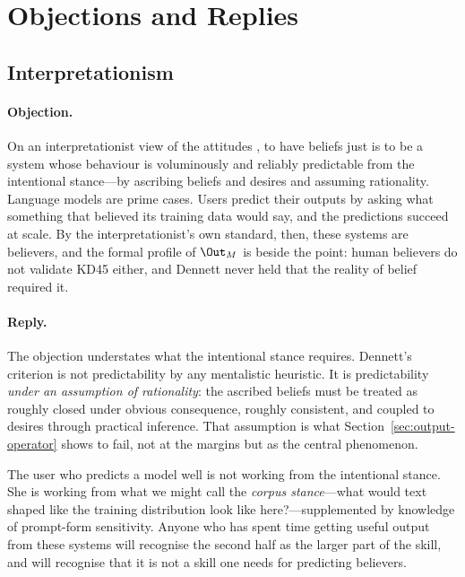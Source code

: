 \section{Objections and Replies}
\label{sec:objections}

\subsection{Interpretationism}
\label{sec:interpretationism}

\paragraph{Objection.} On an interpretationist view of the attitudes
\citep{dennett1987}, to have beliefs just is to be a system whose behaviour is
voluminously and reliably predictable from the intentional stance---by ascribing
beliefs and desires and assuming rationality. Language models are prime cases.
Users predict their outputs by asking what something that believed its training
data would say, and the predictions succeed at scale. By the interpretationist's
own standard, then, these systems are believers, and the formal profile of
$\Out_M$ is beside the point: human believers do not validate KD45 either, and
Dennett never held that the reality of belief required it.

\paragraph{Reply.} The objection understates what the intentional stance
requires. Dennett's criterion is not predictability by any mentalistic heuristic.
It is predictability \emph{under an assumption of rationality}: the ascribed
beliefs must be treated as roughly closed under obvious consequence, roughly
consistent, and coupled to desires through practical inference. That assumption
is what Section~\ref{sec:output-operator} shows to fail, not at the margins but
as the central phenomenon.

The user who predicts a model well is not working from the intentional stance.
She is working from what we might call the \emph{corpus stance}---what would text
shaped like the training distribution look like here?---supplemented by knowledge
of prompt-form sensitivity. Anyone who has spent time getting useful output from
these systems will recognise the second half as the larger part of the skill, and
will recognise that it is not a skill one needs for predicting believers.


